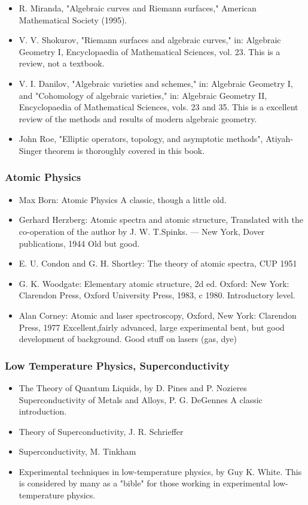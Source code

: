 \documentclass[10pt,a4paper]{book}
\theoremstyle{definition}
\begin{document}
\begin{itemize}
\item    R. Miranda, "Algebraic curves and Riemann surfaces,"  American Mathematical Society (1995).
\item    V. V. Shokurov, "Riemann surfaces and algebraic curves," in: Algebraic Geometry I,  Encyclopaedia of Mathematical Sciences, vol. 23. This is a review, not a textbook.
\item    V. I.  Danilov, "Algebraic varieties and schemes,"  in: Algebraic Geometry I, and "Cohomology of algebraic varieties," in: Algebraic Geometry II,  Encyclopaedia of Mathematical Sciences, vols. 23 and 35. This is a excellent review of the methods and results of modern algebraic geometry.
\item John Roe, "Elliptic operators, topology, and asymptotic methods", Atiyah-Singer theorem is thoroughly covered in this book.

\end{itemize}


\subsubsection{Atomic Physics}
\begin{itemize}
\item 
Max Born: Atomic Physics
A classic, though a little old.
\item Gerhard Herzberg: Atomic spectra and atomic structure, Translated with the co-operation of the author by J. W. T.Spinks. — New York, Dover publications, 1944
Old but good.
\item E. U. Condon and G. H. Shortley: The theory of atomic spectra, CUP 1951
\item G. K. Woodgate: Elementary atomic structure, 2d ed. Oxford: New York: Clarendon Press, Oxford University Press, 1983, c 1980. Introductory level.
\item Alan Corney: Atomic and laser spectroscopy, Oxford, New York: Clarendon Press, 1977
Excellent,fairly advanced, large experimental bent, but good development of background.  Good stuff on lasers (gas, dye)
\end{itemize}


\subsubsection{Low Temperature Physics, Superconductivity}
\begin{itemize}
\item  The Theory of Quantum Liquids, by D. Pines and P. Nozieres
Superconductivity of Metals and Alloys, P. G. DeGennes A classic introduction.
\item Theory of Superconductivity, J. R. Schrieffer
\item Superconductivity, M. Tinkham
\item Experimental techniques in low-temperature physics, by Guy K. White.
This is considered by many as a "bible" for those working in experimental low-temperature physics.
\end{itemize}
\end{document}
